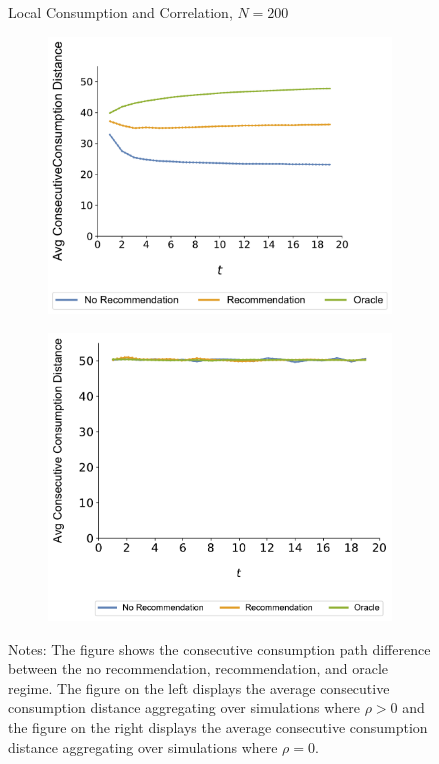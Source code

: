 \documentclass[manuscript]{acmart}
\begin{document}
\begin{figure}[ht]
\caption{Local Consumption and Correlation, $N = 200$}
\begin{subfigure}{.3\linewidth}
  \centering
  \includegraphics[width=1.0\linewidth]{figures/rho_pos_consumption_dist_N_200T_20_overall.pdf}
  \label{fig:sfig1}
\end{subfigure}%
\begin{subfigure}{.3\linewidth}
  \centering
  \includegraphics[width=1.0\linewidth]{figures/rho_zero_consumption_dist_N_200T_20_overall.pdf}
  \label{fig:sfig2}
\end{subfigure}
\caption*{\scriptsize Notes: The figure shows the consecutive consumption path difference between the no recommendation, recommendation, and oracle regime. The figure on the left displays the average consecutive consumption distance aggregating over simulations where $\rho > 0$ and the figure on the right displays the average consecutive consumption distance aggregating over simulations where $\rho = 0$.}
\label{fig:correlation_consumption_path}
\end{figure}
\end{document}
